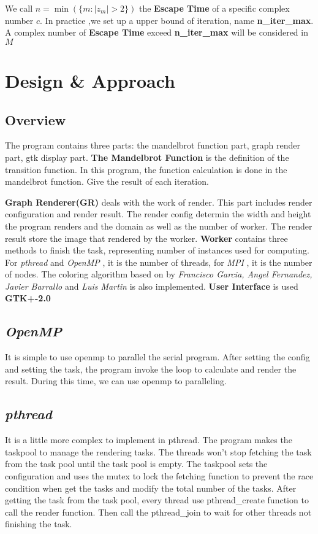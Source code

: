 \documentclass{article}
\newcommand{\pthread} { {\it pthread} }
\newcommand{\openmp} { {\it OpenMP} }
\newcommand{\mpi} { {\it MPI} }
\begin{document}
	We call $n = \min(\{ m:|z_m|>2 \} )$ the {\bf Escape Time} of a specific complex number $c$.
	In practice ,we set up a upper bound of iteration, name {\bf n\_iter\_max}. A complex number of {\bf Escape Time} exceed {\bf n\_iter\_max} will be considered in $M$

\section{Design \& Approach}
	\subsection{Overview}
		The program contains three parts: the mandelbrot function part, graph
		render part, gtk display part.
		{\bf The Mandelbrot Function} is the definition of the transition function.
		In this program, the function calculation is done in the mandelbrot function.
		Give the result of each iteration.

		{\bf Graph Renderer(GR)} deals with the work of render. This part includes
		render configuration and render result. The render config determin the width
		and height the program renders and the domain as well as the number
		of worker. The render result store the image that rendered by the worker.
		{\bf Worker} contains three methods to finish the task, representing number
		of instances used for computing. For \pthread and \openmp, it is the
		number of threads, for \mpi, it is the number of nodes.
		The coloring algorithm based on \cite{color_algo} by {\it Francisco
		Garcia, Angel Fernandez, Javier Barrallo} and {\it Luis Martin} is also
		implemented.
		{\bf User Interface} is used {\bf GTK+-2.0}

	\subsection{\openmp}
		It is simple to use openmp to parallel the serial program.
		After setting the config and setting the task, the program invoke the
		loop to calculate and render the result. During this time, we can use
		openmp to paralleling.

	\subsection{\pthread}
		It is a little more complex to implement in pthread.
		The program makes the taskpool to manage the rendering tasks. The threads
		won't stop fetching the task from the task pool until the task pool is
		empty. The taskpool sets the configuration and uses the mutex to lock
		the fetching function to prevent the race condition when get the tasks and
		modify the total number of the tasks. After getting the task from the
		task pool, every thread use pthread_create function to call the render
		function. Then call the pthread_join to wait for other threads not finishing
		the task.
\end{document}
